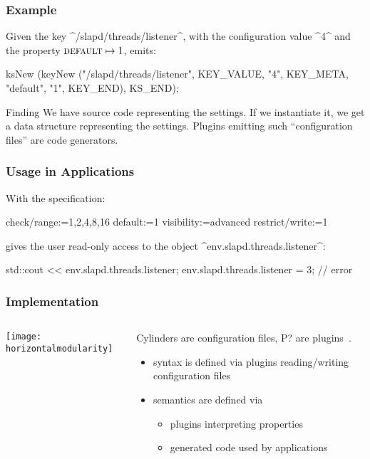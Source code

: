 \begin{frame}[fragile]
	\frametitle{Example}
	\begin{example}
	Given the key ^/slapd/threads/listener^, with the configuration value ^4^ and the property ${\textsc{default}} \mapsto 1$, \elektra{} emits:

	\begin{code}[gobble=4,language=Cpp]
	ksNew (keyNew ("/slapd/threads/listener",
		       KEY_VALUE, "4",
		       KEY_META, "default", "1",
		       KEY_END),
	       KS_END);
	\end{code}
	\vspace{-1em}
	\end{example}

	\pause
	\begin{alertblock}{Finding}
	We have source code representing the settings.
	If we instantiate it, we get a data structure representing the settings.
	Plugins emitting such ``configuration files'' are code generators.
	\end{alertblock}
\end{frame}

\begin{frame}[fragile]
	\frametitle{Usage in Applications}

	With the specification:
	\par
	\begin{code}
	  check/range:=1,2,4,8,16
	  default:=1
	  visibility:=advanced
	  restrict/write:=1
	\end{code}
	\par
	 gives the user read-only access to the object ^env.slapd.threads.listener^:
	\par
	\begin{code}[language=Cpp]
	std::cout << env.slapd.threads.listener;
	env.slapd.threads.listener = 3; // error
	\end{code}
	\par
\end{frame}

\begin{frame}
	\frametitle{Implementation}
	\begin{columns}[c]
	\begin{column}{6cm}
	\texttt{[image: horizontalmodularity]}
	\end{column}
	\begin{column}{5cm}
	Cylinders are configuration files, P? are plugins~\cite{raab2016improving}.

	\begin{itemize}
	\item syntax is defined via plugins reading/writing configuration files
	\item semantics are defined via
		\begin{itemize}
		\item plugins interpreting properties
		\item generated code used by applications
		\end{itemize}
	\end{itemize}
	\end{column}
	\end{columns}
\end{frame}


